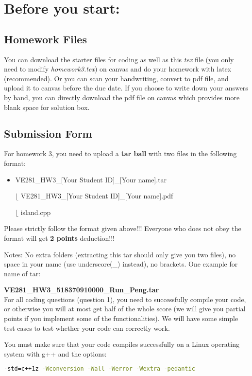 \documentclass[11pt]{exam}
\begin{document}
\setlength{\parindent}{0pt}
\section*{Before you start:}

\subsection*{Homework Files}
You can download the starter files for coding as well as this \textit{tex} file (you only need to modify \textit{homework3.tex}) on canvas and do your homework with latex (recommended). Or you can scan your handwriting, convert to pdf file, and upload it to canvas before the due date. If you choose to write down your answers by hand, you can directly download the pdf file on canvas which provides more blank space for solution box.\\

\subsection*{Submission Form}
For homework 3, you need to upload a \textbf{tar ball} with two files in the following format:
\begin{itemize}
\item VE281\_HW3\_[Your Student ID]\_[Your name].tar

$\lfloor$ VE281\_HW3\_[Your Student ID]\_[Your name].pdf

$\lfloor$ island.cpp

\end{itemize}
{\color{red}Please strictly follow the format given above!!! Everyone who does not obey the format will get \textbf{2 points} deduction!!!}

Notes: No extra folders (extracting this tar should only give you two files), no space in your name (use underscore(\_) instead), no brackets. One example for name of tar:

\textbf{VE281\_HW3\_518370910000\_Run\_Peng.tar}\\

For all coding questions (question 1), you need to successfully compile your code, or otherwise you will {\color{red}at most get half of the whole score} (we will give you partial points if you implement some of the functionalities). We will have some simple test cases to test whether your code can correctly work.

You must make sure that your code compiles successfully on a Linux operating system with g++ and the options:
\begin{lstlisting}[language=bash]
-std=c++1z -Wconversion -Wall -Werror -Wextra -pedantic
\end{lstlisting}
\end{document}
